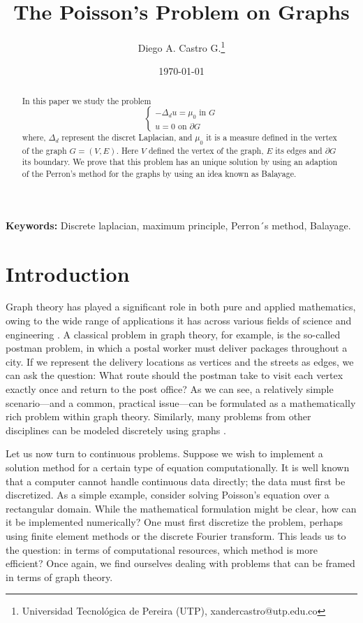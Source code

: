 \documentclass{article}
\title{The Poisson's Problem on Graphs}
\author{ Diego A. Castro G.\footnote{Universidad Tecnológica de Pereira (UTP), xandercastro@utp.edu.co}}
\date{}
\date{\today}
\begin{document}
\maketitle

\begin{abstract}
    \noindent In this paper we study the problem
    \[
      \begin{cases}
           -\Delta_d u=\mu_0 \text{ in } G \\
           u=0 \text{ on } \partial G
      \end{cases}
    \]
    where, $\Delta_d$ represent the discret Laplacian, and $\mu_0$ it is a measure defined in the vertex of the graph $G=(V,E)$. Here $V$ defined the vertex of the graph, $E$ its edges and $\partial G$ its boundary. We prove that this problem has an unique solution by using an adaption of the Perron's method for the graphs by using an idea known as Balayage.
\end{abstract}

\textbf{Keywords:} Discrete laplacian, maximum principle, Perron´s method, Balayage.

\section{Introduction}
Graph theory has played a significant role in both pure and applied mathematics, owing to the wide range of applications it has across various fields of science and engineering \cite{Gross}. A classical problem in graph theory, for example, is the so-called postman problem, in which a postal worker must deliver packages throughout a city. If we represent the delivery locations as vertices and the streets as edges, we can ask the question: What route should the postman take to visit each vertex exactly once and return to the post office? As we can see, a relatively simple scenario—and a common, practical issue—can be formulated as a mathematically rich problem within graph theory. Similarly, many problems from other disciplines can be modeled discretely using graphs \cite{Henning}.

Let us now turn to continuous problems. Suppose we wish to implement a solution method for a certain type of equation computationally. It is well known that a computer cannot handle continuous data directly; the data must first be discretized. As a simple example, consider solving Poisson’s equation over a rectangular domain. While the mathematical formulation might be clear, how can it be implemented numerically? One must first discretize the problem, perhaps using finite element methods or the discrete Fourier transform. This leads us to the question: in terms of computational resources, which method is more efficient? Once again, we find ourselves dealing with problems that can be framed in terms of graph theory.
\end{document}
